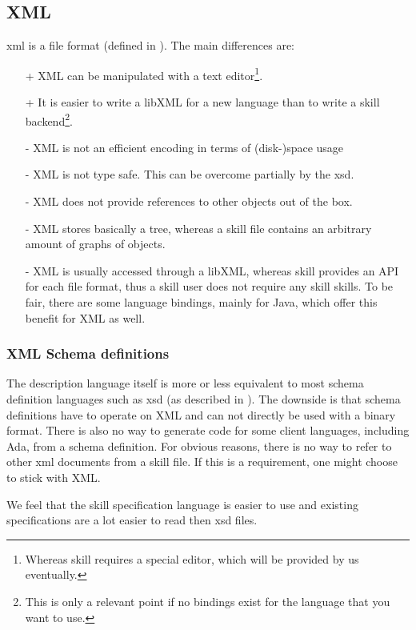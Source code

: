 \subsection*{XML}

\gls{xml} is a file format (defined in \cite{xml11}). The main differences are:
\begin{itemize}
 \item[+] XML can be manipulated with a text editor\footnote{Whereas skill requires a special editor, which will be provided by us eventually.}.
 \item[+] It is easier to write a libXML for a new language than to write a \gls{skill} backend\footnote{This is only a relevant point if no bindings exist for the language that you want to use.}.
 \item[-] XML is not an efficient encoding in terms of (disk-)space usage
 \item[-] XML is not type safe. This can be overcome partially by the \gls{xsd}.
 \item[-] XML does not provide references to other objects out of the box.
 \item[-] XML stores basically a tree, whereas a skill file contains an arbitrary amount of graphs of objects.
 \item[-] XML is usually accessed through a libXML, whereas \gls{skill} provides an API for each file format, thus a skill user does not require any \gls{skill} skills. To be fair, there are some language bindings, mainly for Java, which offer this benefit for XML as well.
\end{itemize}

\subsubsection*{XML Schema definitions}

The description language itself is more or less equivalent to most schema definition languages such as \gls{xsd} (as described in \cite{xsd11-1,xsd11-2}). The downside is that schema definitions have to operate on XML and can not directly be used with a binary format. There is also
no way to generate code for some client languages, including Ada, from a schema definition. For obvious reasons, there is no way to refer to other \gls{xml} documents from a \gls{skill} file. If this is a requirement, one might choose to stick with XML.

We feel that the \gls{skill} specification language is easier to use and existing specifications are a lot easier to read then \gls{xsd} files.

